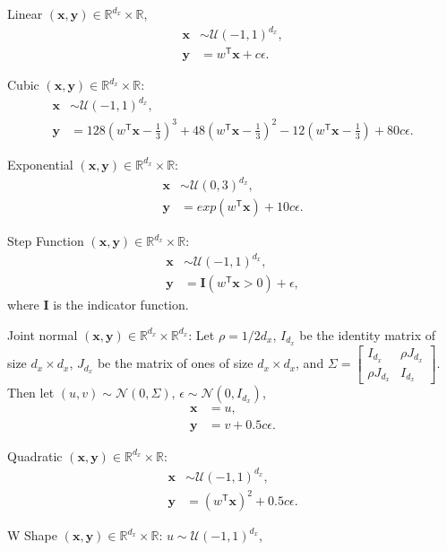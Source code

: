 \documentclass[11pt]{article}
\providecommand{\mb}[1]{\boldsymbol{#1}}
\providecommand{\mc}[1]{\mathcal{#1}}
\newcommand{\Real}{\mathbb{R}}
\newcommand{\T}{^{\ensuremath{\mathsf{T}}}}           %
\newcommand{\mbx}{\ensuremath{\mb{x}}}
\newcommand{\mby}{\ensuremath{\mb{y}}}
\begin{document}
\setcounter{equation}{0}
\begin{compactenum}
\item Linear $(\mbx,\mby) \in \Real^{d_{x}} \times \Real$,
\begin{align*}
\mbx &\sim \mc{U}(-1,1)^{d_{x}},\\
\mby &=w\T \mbx+c\epsilon.
\end{align*}
\item Cubic $(\mbx,\mby) \in \Real^{d_{x}} \times \Real$:
\begin{align*}
\mbx &\sim \mc{U}(-1,1)^{d_{x}}, \\
\mby &=128(w\T \mbx-\tfrac{1}{3})^3+48(w\T \mbx-\tfrac{1}{3})^2-12(w\T \mbx-\tfrac{1}{3})+80c\epsilon.
\end{align*}
\item Exponential $(\mbx,\mby) \in \Real^{d_{x}} \times \Real$:
\begin{align*}
\mbx &\sim \mc{U}(0,3)^{d_{x}}, \\
\mby &=exp(w\T \mbx)+10c\epsilon.
\end{align*}
\item Step Function $(\mbx,\mby) \in \Real^{d_{x}} \times \Real$:
\begin{align*}
\mbx &\sim \mc{U}(-1,1)^{d_{x}},\\
\mby &=\mb{I}(w\T \mbx>0)+\epsilon,
\end{align*}
where $\mb{I}$ is the indicator function.
\item Joint normal $(\mbx,\mby) \in \Real^{d_{x}} \times \Real^{d_{x}}$: Let $\rho=1/2d_{x}$, $I_{d_{x}}$ be the identity matrix of size $d_{x} \times d_{x}$, $J_{d_{x}}$ be the matrix of ones of size $d_{x} \times d_{x}$, and $\Sigma = \begin{bmatrix} I_{d_{x}}&\rho J_{d_{x}}\\ \rho J_{d_{x}}&I_{d_{x}} \end{bmatrix}$. Then let $(u,v) \sim \mc{N}(0, \Sigma)$, $\epsilon \sim \mc{N}(0, I_{d_{x}})$,
\begin{align*}
\mbx &=u,\\
\mby &=v+0.5c\epsilon.
\end{align*}
\item Quadratic $(\mbx,\mby) \in \Real^{d_{x}} \times \Real$:
\begin{align*}
\mbx &\sim \mc{U}(-1,1)^{d_{x}},\\
\mby&=(w\T \mbx)^2+0.5c\epsilon.
\end{align*}
\item W Shape $(\mbx,\mby) \in \Real^{d_{x}} \times \Real$:  $u \sim \mc{U}(-1,1)^{d_{x}}$,

\end{compactenum}
\end{document}
